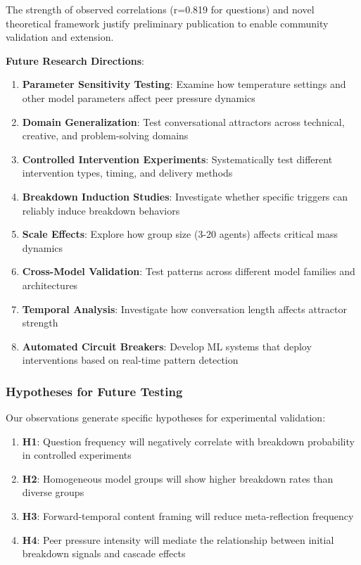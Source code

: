 \documentclass[11pt,letterpaper]{article}
\newcommand{\exponedataQuestionCorrelation}{0.819}
\begin{document}
The strength of observed correlations (r=\exponedataQuestionCorrelation{} for questions) and novel theoretical framework justify preliminary publication to enable community validation and extension.

\textbf{Future Research Directions}:

\begin{enumerate}
    \item \textbf{Parameter Sensitivity Testing}: Examine how temperature settings and other model parameters affect peer pressure dynamics
    \item \textbf{Domain Generalization}: Test conversational attractors across technical, creative, and problem-solving domains
    \item \textbf{Controlled Intervention Experiments}: Systematically test different intervention types, timing, and delivery methods
    \item \textbf{Breakdown Induction Studies}: Investigate whether specific triggers can reliably induce breakdown behaviors
    \item \textbf{Scale Effects}: Explore how group size (3-20 agents) affects critical mass dynamics
    \item \textbf{Cross-Model Validation}: Test patterns across different model families and architectures
    \item \textbf{Temporal Analysis}: Investigate how conversation length affects attractor strength
    \item \textbf{Automated Circuit Breakers}: Develop ML systems that deploy interventions based on real-time pattern detection
\end{enumerate}

\subsubsection{Hypotheses for Future Testing}

Our observations generate specific hypotheses for experimental validation:

\begin{enumerate}
    \item \textbf{H1}: Question frequency will negatively correlate with breakdown probability in controlled experiments
    \item \textbf{H2}: Homogeneous model groups will show higher breakdown rates than diverse groups
    \item \textbf{H3}: Forward-temporal content framing will reduce meta-reflection frequency
    \item \textbf{H4}: Peer pressure intensity will mediate the relationship between initial breakdown signals and cascade effects
\end{enumerate}
\end{document}
